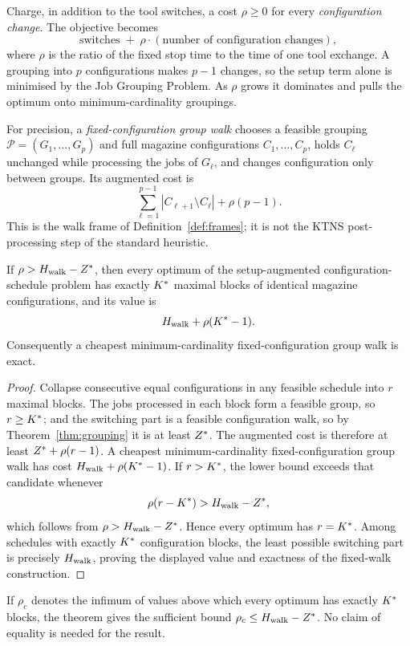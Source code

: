 Charge, in addition to the tool switches, a cost $\rho\ge0$ for every
\emph{configuration change}. The objective becomes
\[
  \text{switches}\;+\;\rho\cdot(\text{number of configuration changes}),
\]
where $\rho$ is the ratio of the fixed stop time to the time of one tool exchange. A
grouping into $p$ configurations makes $p-1$ changes, so the setup term alone is
minimised by the Job Grouping Problem. As $\rho$ grows it dominates and pulls the
optimum onto minimum-cardinality groupings.

For precision, a \emph{fixed-configuration group walk} chooses a feasible grouping
$\mathcal P=(G_1,\ldots,G_p)$ and full magazine configurations
$C_1,\ldots,C_p$, holds $C_\ell$ unchanged while processing the jobs of $G_\ell$,
and changes configuration only between groups. Its augmented cost is
\[
  \sum_{\ell=1}^{p-1}|C_{\ell+1}\setminus C_\ell|+\rho(p-1).
\]
This is the walk frame of Definition~\ref{def:frames}; it is not the KTNS
post-processing step of the standard heuristic.

\begin{theorem}\label{thm:collapse}
If $\rho>H_{\mathrm{walk}}-Z^{\ast}$, then every optimum of the setup-augmented configuration-schedule
problem has exactly $K^{\ast}$ maximal blocks of identical magazine configurations, and
its value is
\[
  H_{\mathrm{walk}}+\rho(K^{\ast}-1).
\]
Consequently a cheapest minimum-cardinality fixed-configuration group walk is exact.
\end{theorem}

\begin{proof}
Collapse consecutive equal configurations in any feasible schedule into $r$ maximal
blocks. The jobs processed in each block form a feasible group, so $r\ge K^{\ast}$; and
the switching part is a feasible configuration walk, so by
Theorem~\ref{thm:grouping} it is at least $Z^{\ast}$. The augmented cost is therefore at
least $Z^{\ast}+\rho(r-1)$. A cheapest minimum-cardinality fixed-configuration group walk
has cost $H_{\mathrm{walk}}+\rho(K^{\ast}-1)$. If $r>K^{\ast}$, the lower bound exceeds that candidate
whenever
\[
  \rho(r-K^{\ast})>H_{\mathrm{walk}}-Z^{\ast},
\]
which follows from $\rho>H_{\mathrm{walk}}-Z^{\ast}$. Hence every optimum has $r=K^{\ast}$. Among
schedules with exactly $K^{\ast}$ configuration blocks, the least possible switching part
is precisely $H_{\mathrm{walk}}$, proving the displayed value and exactness of the fixed-walk
construction.
\end{proof}

If $\rho_c$ denotes the infimum of values above which every optimum has exactly
$K^{\ast}$ blocks, the theorem gives the sufficient bound
$\rho_c\le H_{\mathrm{walk}}-Z^{\ast}$. No claim of equality is needed for the result.

